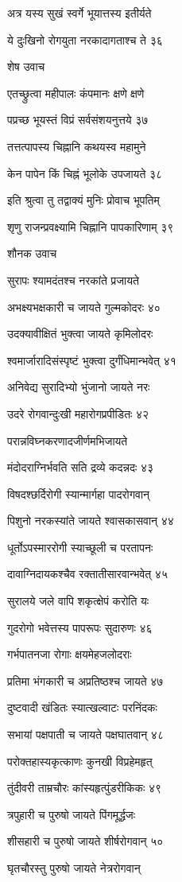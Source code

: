अत्र यस्य सुखं स्वर्गे भूयात्तस्य इतीर्यते

ये दुःखिनो रोगयुता नरकादागताश्च ते ३६

शेष उवाच

एतच्छ्रुत्वा महीपालः कंपमानः क्षणे क्षणे

पप्रच्छ भूयस्तं विप्रं सर्वसंशयनुत्तये ३७

तत्तत्पापस्य चिह्नानि कथयस्व महामुने

केन पापेन किं चिह्नं भूलोके उपजायते ३८

इति श्रुत्वा तु तद्वाक्यं मुनिः प्रोवाच भूपतिम्

शृणु राजन्प्रवक्ष्यामि चिह्नानि पापकारिणाम् ३९

शौनक उवाच

सुरापः श्यामदंतश्च नरकांते प्रजायते

अभक्ष्यभक्षकारी च जायते गुल्मकोदरः ४०

उदक्यावीक्षितं भुक्त्वा जायते कृमिलोदरः

श्वमार्जारादिसंस्पृष्टं भुक्त्वा दुर्गंधिमान्भवेत् ४१

अनिवेद्य सुरादिभ्यो भुंजानो जायते नरः

उदरे रोगवान्दुःखी महारोगप्रपीडितः ४२

परान्नविघ्नकरणादजीर्णमभिजायते

मंदोदराग्निर्भवति सति द्रव्ये कदन्नदः ४३

विषदश्छर्दिरोगी स्यान्मार्गहा पादरोगवान्

पिशुनो नरकस्यांते जायते श्वासकासवान् ४४

धूर्तोऽपस्माररोगी स्याच्छूली च परतापनः

दावाग्निदायकश्चैव रक्तातीसारवान्भवेत् ४५

सुरालये जले वापि शकृत्क्षेपं करोति यः

गुदरोगो भवेत्तस्य पापरूपः सुदारुणः ४६

गर्भपातनजा रोगाः क्षयमेहजलोदराः

प्रतिमा भंगकारी च अप्रतिष्ठश्च जायते ४७

दुष्टवादी खंडितः स्यात्खल्वाटः परनिंदकः

सभायां पक्षपाती च जायते पक्षघातवान् ४८

परोक्तहास्यकृत्काणः कुनखी विप्रहेमहृत्

तुंदीवरी ताम्रचौरः कांस्यहृत्पुंडरीकिकः ४९

त्रपुहारी च पुरुषो जायते पिंगमूर्द्धजः

शीसहारी च पुरुषो जायते शीर्षरोगवान् ५०

घृतचौरस्तु पुरुषो जायते नेत्ररोगवान्


